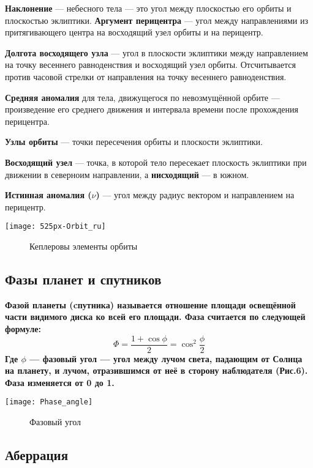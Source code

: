 \documentclass[10pt,a5paper]{article}
\begin{document}
\textbf{Наклонение} --- небесного тела — это угол между плоскостью его орбиты и плоскостью эклиптики.
\textbf{Аргумент перицентра} --- угол между направлениями из притягивающего центра на восходящий узел орбиты и на перицентр.

\textbf{Долгота восходящего узла} --- угол в плоскости эклиптики между направлением на точку весеннего равноденствия и восходящий узел орбиты. Отсчитывается против часовой стрелки от направления на точку весеннего равноденствия.

\textbf{Средняя аномалия} для тела, движущегося по невозмущённой орбите --- произведение его среднего движения и интервала времени после прохождения перицентра.

\textbf{Узлы орбиты} --- точки пересечения орбиты и плоскости эклиптики.

\textbf{Восходящий узел} --- точка, в которой тело пересекает плоскость эклиптики при движении в северноим направлении, а \textbf{нисходящий} --- в южном.

\textbf{Истинная аномалия ($\nu$)} --- угол между радиус вектором и направлением на перицентр.
\begin{center}
\texttt{[image: 525px-Orbit\_ru]}
\begin{figure}[h!]
\caption{Кеплеровы элементы орбиты}
\end{figure}
\end{center}
\subsection{Фазы планет и спутников}

\bfseries Фазой \mdseries планеты (cпутника) называется отношение площади освещённой  части видимого диска ко всей его площади.
Фаза считается по следующей формуле:
$$\Phi=\frac{1+\cos\phi}{2}=\cos^2\frac{\phi}{2}$$
Где $\phi$ --- \textbf{фазовый угол} --- угол между лучом света, падающим от Солнца на планету, и лучом, отразившимся от неё в сторону наблюдателя (Рис.6). Фаза изменяется от 0 до 1.
\begin{center}
\texttt{[image: Phase\_angle]}
\begin{figure}[h!]
\caption{Фазовый угол}
\end{figure}
\end{center}
\subsection{Аберрация}
\end{document}
